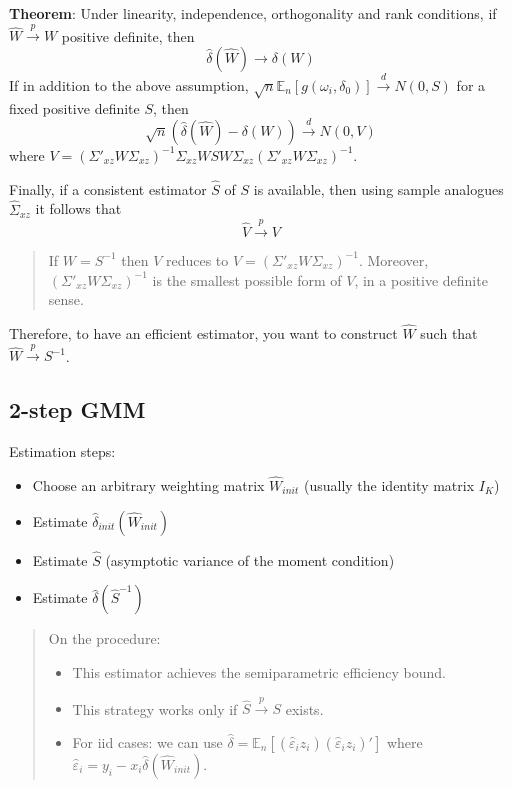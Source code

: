 \documentclass[12pt,]{book}
\providecommand{\tightlist}{%
  \setlength{\itemsep}{0pt}\setlength{\parskip}{0pt}}
\begin{document}
\textbf{Theorem}:
Under linearity, independence, orthogonality and rank conditions, if \(\hat{W} \overset{p}{\to} W\) positive definite, then
\[
    \hat{\delta}(\hat{W}) \to \delta(W)
\]
If in addition to the above assumption, \(\sqrt{n} \mathbb E_n [g(\omega_i, \delta_0)] \overset{d}{\to} N(0,S)\) for a fixed positive definite \(S\), then
\[
    \sqrt{n} (\hat{\delta} (\hat{W}) - \delta(W)) \overset{d}{\to} N(0,V)
\]
where \(V = (\Sigma' _ {xz} W \Sigma _ {xz})^{-1} \Sigma _ {xz} W S W \Sigma _ {xz}(\Sigma' _ {xz} W \Sigma _ {xz})^{-1}\).

Finally, if a consistent estimator \(\hat{S}\) of \(S\) is available, then using sample analogues \(\hat{\Sigma}_{xz}\) it follows that
\[
    \hat{V} \overset{p}{\to} V
\]

\begin{quote}
If \(W = S^{-1}\) then \(V\) reduces to \(V = (\Sigma' _ {xz} W \Sigma _ {xz})^{-1}\). Moreover, \((\Sigma' _ {xz} W \Sigma _ {xz})^{-1}\) is the smallest possible form of \(V\), in a positive definite sense.
\end{quote}

Therefore, to have an efficient estimator, you want to construct \(\hat{W}\) such that \(\hat{W} \overset{p}{\to} S^{-1}\).

\hypertarget{step-gmm-1}{%
\subsection{2-step GMM}\label{step-gmm-1}}

Estimation steps:

\begin{itemize}
\tightlist
\item
  Choose an arbitrary weighting matrix \(\hat{W}_{init}\) (usually the identity matrix \(I_K\))
\item
  Estimate \(\hat{\delta} _ {init}(\hat{W} _ {init})\)
\item
  Estimate \(\hat{S}\) (asymptotic variance of the moment condition)
\item
  Estimate \(\hat{\delta}(\hat{S}^{-1})\)
\end{itemize}

\begin{quote}
On the procedure:

\begin{itemize}
\tightlist
\item
  This estimator achieves the semiparametric efficiency bound.
\item
  This strategy works only if \(\hat{S} \overset{p}{\to} S\) exists.
\item
  For iid cases: we can use \(\hat{\delta} = \mathbb E_n[(\hat{\varepsilon}_i z_i)(\hat{\varepsilon}_i z_i) ' ]\) where \(\hat{\varepsilon}_i = y_i - x_i \hat{\delta}(\hat{W} _ {init})\).
\end{itemize}
\end{quote}
\end{document}
